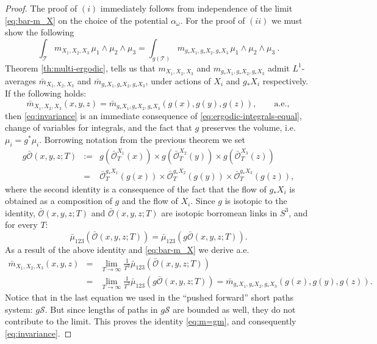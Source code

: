 \documentclass[12pt]{article}
\begin{document}
\begin{proof}%
The proof of $(i)$ immediately follows from independence of the limit \eqref{eq:bar-m_X}
on the choice of the potential $\alpha_\omega$.
For the proof of  $(ii)$ we must show the following
\[
 \int_\mathcal{T} m_{X_1,X_2,X_3}\,\mu_1\wedge \mu_2\wedge \mu_3=\int_{g(\mathcal{T})} m_{g_\ast X_1,g_\ast X_2, g_\ast X_3}\,\mu_1\wedge \mu_2\wedge \mu_3\ .
\]
Theorem \ref{th:multi-ergodic}, tells us that $m_{X_1,X_2,X_3}$ and $m_{g_\ast X_1,g_\ast X_2, g_\ast X_3}$ admit $L^1$-averages $\bar{m}_{X_1,X_2,X_3}$ and $\bar{m}_{g_\ast X_1,g_\ast X_2, g_\ast X_3}$, under actions of $X_i$ and $g_\ast X_i$ respectively. If the following holds:
\begin{equation}\label{eq:m=gm}
 \bar{m}_{X_1,X_2,X_3}(x,y,z)=\bar{m}_{g_\ast X_1,g_\ast X_2, g_\ast X_3}(g(x),g(y),g(z)),\qquad \text{a.e.},
\end{equation}
then \eqref{eq:invariance} is an immediate consequence of \eqref{eq:ergodic-integrals-equal}, change of variables for integrals, and the fact that $g$ preserves the volume, i.e. $\mu_i=g^\ast\mu_i$.
Borrowing notation from the previous theorem we set
\begin{eqnarray*}
 g\bar{\mathscr{O}}(x,y,z;T) & := & g(\bar{\mathscr{O}}^{X_1}_T(x))\times g(\bar{\mathscr{O}}^{X_2}_T(y))\times g(\bar{\mathscr{O}}^{X_3}_T(z))\\
 & = & \bar{\mathscr{O}}^{g_\ast X_1}_T(g(x))\times \bar{\mathscr{O}}^{g_\ast X_2}_T(g(y))\times \bar{\mathscr{O}}^{g_\ast X_3}_T(g(z)),
\end{eqnarray*}
where the second identity is a consequence of the fact that the flow of $g_\ast X_i$ is 
obtained as a composition of $g$ and the flow of $X_i$.
Since $g$ is isotopic to the identity, $\bar{\mathscr{O}}(x,y,z;T)$ and $\bar{\mathscr{O}}(x,y,z;T)$
 are isotopic borromean links in $S^3$, and for every $T$:
 \[
  \bar{\mu}_{123}(\bar{\mathscr{O}}(x,y,z;T))=\bar{\mu}_{123}(g\bar{\mathscr{O}}(x,y,z;T)).
 \]
 As a result of the above identity and \eqref{eq:bar-m_X} we derive a.e.
\begin{eqnarray*}
  \bar{m}_{X_1,X_2,X_3}(x,y,z) & = & \lim_{T\to\infty}\frac{1}{T^3}\bar{\mu}_{123}(\bar{\mathscr{O}}(x,y,z;T))\\
   & = & \lim_{T\to\infty}\frac{1}{T^3}\bar{\mu}_{123}(g\bar{\mathscr{O}}(x,y,z;T))=\bar{m}_{g_\ast X_1,g_\ast X_2, g_\ast X_3}(g(x),g(y),g(z)).
\end{eqnarray*}
Notice that in the last equation we used in the ``pushed forward'' short paths system: $g\mathcal{S}$.
But since lengths of paths in $g\mathcal{S}$ are bounded as well, they do not contribute to the limit. This proves the identity \eqref{eq:m=gm}, and consequently \eqref{eq:invariance}.
\end{proof}
\end{document}

